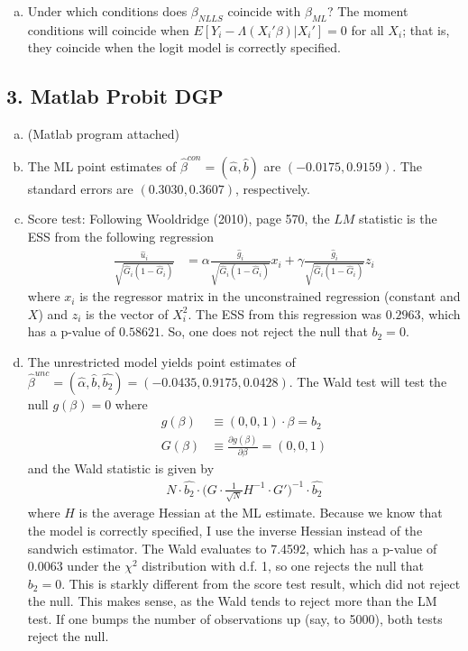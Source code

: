 \documentclass[11pt]{article}
\begin{document}
\begin{enumerate}[a)]
	\item Under which conditions does $\beta_{NLLS}$ coincide with $\beta_{ML}$? The moment conditions will coincide when $E[Y_i - \Lambda(X_i'\beta) | X_i'] = 0$ for all $X_i$; that is, they coincide when the logit model is correctly specified.

\end{enumerate}


\subsection*{3. Matlab Probit DGP}

\begin{enumerate}[a)]

	\item (Matlab program attached)

	\item The ML point estimates of $\hat{\beta}^{con} = (\hat{\alpha},\hat{b})$ are $(-0.0175,0.9159)$. The standard errors are $(0.3030,0.3607)$, respectively.

	\item Score test: Following Wooldridge (2010), page 570, the $LM$ statistic is the ESS from the following regression
	\begin{align*}
		\frac{\hat{u}_i}{\sqrt{\hat{G}_i (1 - \hat{G}_i)}} &= \alpha \frac{\hat{g}_i}{\sqrt{\hat{G}_i(1 - \hat{G}_i)}} x_i + \gamma  \frac{\hat{g}_i}{\sqrt{\hat{G}_i(1 - \hat{G}_i)}} z_i
	\end{align*}
	where $x_i$ is the regressor matrix in the unconstrained regression (constant and $X$) and $z_i$ is the vector of $X_i^2$. The ESS from this regression was $0.2963$, which has a p-value of $0.58621$. So, one does not reject the null that $b_2 = 0$.

	\item The unrestricted model yields point estimates of $\hat{\beta}^{unc} = (\hat{\alpha},\hat{b},\hat{b_2}) = (-0.0435, 0.9175, 0.0428)$. The Wald test will test the null $g(\beta) = 0$ where
	\begin{align*}
		g(\beta) &\equiv (0, 0, 1) \cdot \beta = b_2 \\
		G(\beta) &\equiv \frac{\partial g(\beta)}{\partial \beta} = (0, 0, 1)
	\end{align*}
	and the Wald statistic is given by
	\begin{align*}
		N \cdot \hat{b_2} \cdot \bigg( G \cdot \frac{1}{\sqrt{N}}H^{-1} \cdot G' \bigg)^{-1} \cdot \hat{b_2}
	\end{align*}
	where $H$ is the average Hessian at the ML estimate. Because we know that the model is correctly specified, I use the inverse Hessian instead of the sandwich estimator. The Wald evaluates to 7.4592, which has a p-value of $0.0063$ under the $\chi^2$ distribution with d.f. 1, so one rejects the null that $b_2 = 0$. This is starkly different from the score test result, which did not reject the null. This makes sense, as the Wald tends to reject more than the LM test. If one bumps the number of observations up (say, to 5000), both tests reject the null.

\end{enumerate}
\end{document}
